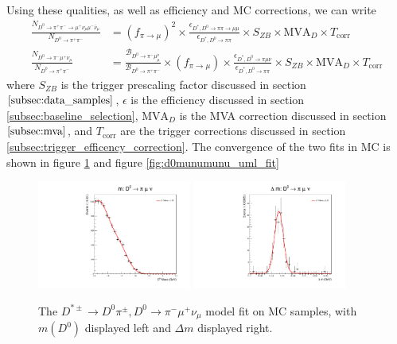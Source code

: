 Using these qualities, as well as efficiency and MC corrections, we can write
\begin{equation}
\begin{split}
    \frac{N_{D^0 \to \pi^+ \pi^- \to \mu^+ \nu_\mu \mu^- \bar{\nu}_\mu}}{N_{D^0 \to \pi^+ \pi^-}} &= \left(f_{\pi \to \mu}\right)^2 \times \frac{\epsilon_{D^*, D^0\to\pi\pi\to\mu\mu}}{\epsilon_{D^*, D^0\to\pi\pi}} \times S_{ZB} \times \text{MVA}_D \times T_{\text{corr}} \\
    \frac{N_{D^0 \to \pi^- \mu^+ \nu_\mu}}{N_{D^0 \to \pi^+ \pi^-}} &=\frac{\mathcal{B}_{D^0 \to \pi^- \mu^ \nu_\mu}}{\mathcal{B}_{D^0 \to \pi^+ \pi^-}} \times \left(f_{\pi \to \mu}\right) \times \frac{\epsilon_{D^*, D^0\to\pi\mu\nu}}{\epsilon_{D^*, D^0\to\pi\pi}} \times S_{ZB} \times \text{MVA}_D \times T_{\text{corr}}
    \label{eq:peaking_background_yield_calculation}
\end{split}
\end{equation}
where $S_{ZB}$ is the trigger prescaling factor discussed in section $\ref{subsec:data_samples}$, $\epsilon$ is the efficiency discussed in section \ref{subsec:baseline_selection}, $\text{MVA}_D$ is the MVA correction discussed in section $\ref{subsec:mva}$, and $T_{\text{corr}}$ are the trigger corrections discussed in section \ref{subsec:trigger_efficency_correction}. The convergence of the two fits in MC is shown in figure \ref{fig:d0pimunu_uml_fit} and figure \ref{fig:d0munumunu_uml_fit}

\begin{figure}[htp]
    \begin{center}
      \includegraphics[width=0.45\textwidth]{figures/chapter4/signal_fit/d0pimunu_2022_2023_0_m.pdf}
      \includegraphics[width=0.45\textwidth]{figures/chapter4/signal_fit/d0pimunu_2022_2023_0_dm.pdf}\\
    \end{center}
    \caption{
      The $D^{*\pm} \to D^0\pi^\pm, D^0 \to \pi^- \mu^+ \nu_\mu$ model fit on MC samples, with $m(D^0)$ displayed left and $\Delta m$ displayed right.
    }
    \label{fig:d0pimunu_uml_fit}
\end{figure}


